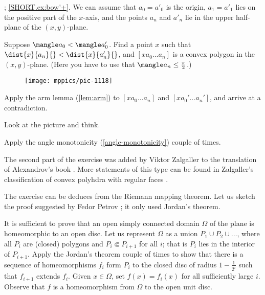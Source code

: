 \parbf{\ref{ex:arm'}};
\ref{SHORT.ex:bow'+}.
We can assume that $a_0=a'_0$ is the origin, $a_1=a'_1$ lies on the positive part of the $x$-axis,
and the points $a_n$ and $a'_n$ lie in the upper half-plane of the $(x,y)$-plane.

Suppose $\mangle a_0<\mangle a_0'$.
Find a point $x$ such that
$\dist{x}{a_n}{}<\dist{x}{a_n'}{}$, and $[x a_0\dots a_n]$ is a convex polygon in the $(x,y)$-plane.
(Here you have to use that $\mangle a_n\le\tfrac\pi2$.)

{

\begin{wrapfigure}{r}{47 mm}
\vskip-7mm
\centering
\texttt{[image: mppics/pic-1118]}
\vskip0mm
\end{wrapfigure}

Apply the arm lemma (\ref{lem:arm}) to $[x a_0\dots a_n]$ and $[x a_0'\dots a_n']$, and arrive at a contradiction.

 Look at the picture and think.

}

Apply the angle monotonicity (\ref{angle-monotonicity}) couple of times.


 The second part of the exercise was added by Viktor Zalgaller to the translation of Alexandrov's book \cite{alexandrov}.
More statements of this type can be found in Zalgaller's classification of convex polyhdra with regular faces \cite{zalgaller}.


The exercise can be deduces from the Riemann mapping theorem.
Let us sketch the proof suggested by Fedor Petrov \cite{petrov};
it only used Jordan's theorem.

\medskip

It is sufficient to prove that an open simply connected domain $\Omega$ of the plane is homeomorphic to an open disc.
Let us represent $\Omega$ as a union $P_1\cup P_2\cup\ldots$, where all $P_i$ are (closed) polygons and $P_i\Subset P_{i+1}$ for all $i$; that is $P_i$ lies in the interior of $P_{i+1}$.
Apply the Jordan's theorem couple of times to show that there is a sequence of homeomorphisms $f_i$ form $P_i$ to the closed disc of radius $1-\tfrac1{2^i}$ such that $f_{i+1}$ extends $f_i$.
Given $x\in \Omega$, set $f(x)=f_i(x)$ for all sufficiently large $i$.
Observe that $f$ is a homeomorphism from $\Omega$ to the open unit disc.

